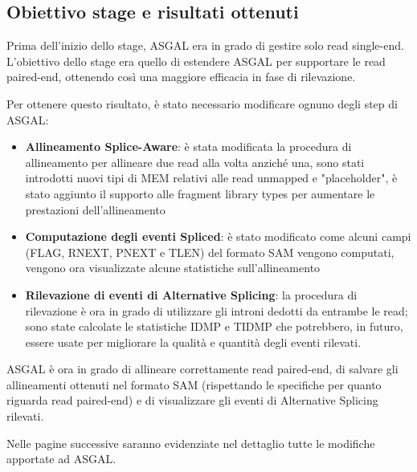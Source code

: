 \subsection{Obiettivo stage e risultati ottenuti}
Prima dell'inizio dello stage, ASGAL era in grado di gestire solo read single-end. L'obiettivo dello stage era quello di estendere ASGAL per supportare le read paired-end, ottenendo così una maggiore efficacia in fase di rilevazione.

Per ottenere questo risultato, è stato necessario modificare ognuno degli step di ASGAL:
\begin{itemize}
	\item \textbf{Allineamento Splice-Aware}: è stata modificata la procedura di allineamento per allineare due read alla volta anziché una, sono stati introdotti nuovi tipi di MEM relativi alle read unmapped e "placeholder", è stato aggiunto il supporto alle fragment library types per aumentare le prestazioni dell'allineamento
	\item \textbf{Computazione degli eventi Spliced}: è stato modificato come alcuni campi (FLAG, RNEXT, PNEXT e TLEN) del formato SAM vengono computati, vengono ora visualizzate alcune statistiche sull'allineamento
	\item \textbf{Rilevazione di eventi di Alternative Splicing}: la procedura di rilevazione è ora in grado di utilizzare gli introni dedotti da entrambe le read; sono state calcolate le statistiche IDMP e TIDMP che potrebbero, in futuro, essere usate per migliorare la qualità e quantità degli eventi rilevati.
\end{itemize}

ASGAL è ora in grado di allineare correttamente read paired-end, di salvare gli allineamenti ottenuti nel formato SAM (rispettando le specifiche per quanto riguarda read paired-end) e di visualizzare gli eventi di Alternative Splicing rilevati. 

Nelle pagine successive saranno evidenziate nel dettaglio tutte le modifiche apportate ad ASGAL.